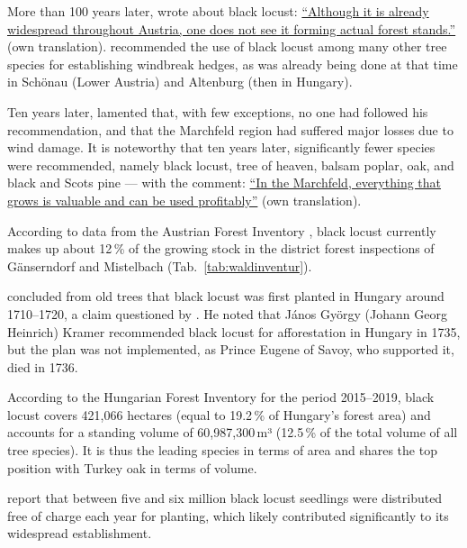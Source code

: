 More than 100 years later, \citet[p.~339]{Feistmantel1835dieForstwissenschaft} wrote about black locust: \hyperlink{german:Feistmantel1835dieForstwissenschaft}{\enquote{Although it is already widespread throughout Austria, one does not see it forming actual forest stands.}} (own translation). \citet{hofmann1851baumloseEbenen} recommended the use of black locust among many other tree species for establishing windbreak hedges, as was already being done at that time in Schönau (Lower Austria) and Altenburg (then in Hungary).

Ten years later, \citet{hofmann1861waldbaumCulturWarchfelde} lamented that, with few exceptions, no one had followed his recommendation, and that the Marchfeld region had suffered major losses due to wind damage. It is noteworthy that ten years later, significantly fewer species were recommended, namely black locust, tree of heaven, balsam poplar, oak, and black and Scots pine — with the comment: \hyperlink{german:hofmann1861waldbaumCulturWarchfelde}{\enquote{In the Marchfeld, everything that grows is valuable and can be used profitably}} (own translation).

According to data from the Austrian Forest Inventory \citep{bfw2025waldinventurWeb}, black locust currently makes up about 12\,\% of the growing stock in the district forest inspections of Gänserndorf and Mistelbach (Tab.~\ref{tab:waldinventur}).


\citet[p.~3]{vadas1911robinie} concluded from old trees that black locust was first planted in Hungary around 1710–1720, a claim questioned by \citet[p.~179]{ernyey1926robinie}. He noted that János György (Johann Georg Heinrich) Kramer recommended black locust for afforestation in Hungary in 1735, but the plan was not implemented, as Prince Eugene of Savoy, who supported it, died in 1736.

According to the Hungarian Forest Inventory \citep{waldinventur20152019ungarn} for the period 2015–2019, black locust covers 421,066 hectares (equal to 19.2\,\% of Hungary's forest area) and accounts for a standing volume of 60,987,300\,m³ (12.5\,\% of the total volume of all tree species). It is thus the leading species in terms of area and shares the top position with Turkey oak in terms of volume.

\citet{bund1899robinie,gaskil1906robinie} report that between five and six million black locust seedlings were distributed free of charge each year for planting, which likely contributed significantly to its widespread establishment.


